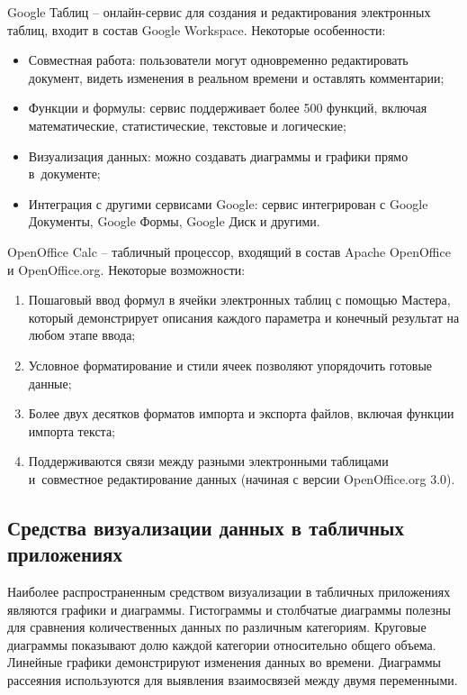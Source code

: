 \documentclass{ou}
\begin{document}
Google Таблиц -- онлайн-сервис для создания и редактирования электронных таблиц, входит в состав Google Workspace. Некоторые особенности:  
\begin{itemize}[label=-, leftmargin=0em, itemindent=3.35em, nosep]
\item Совместная работа: пользователи могут одновременно редактировать документ, видеть изменения в реальном времени и оставлять комментарии;
\item Функции и формулы: сервис поддерживает более 500 функций, включая математические, статистические, текстовые и логические;
\item Визуализация данных: можно создавать диаграммы и графики прямо в~документе;
\item Интеграция с другими сервисами Google: сервис интегрирован с Google Документы, Google Формы, Google Диск и другими.
\end{itemize}

OpenOffice Calc -- табличный процессор, входящий в состав Apache OpenOffice и OpenOffice.org. Некоторые возможности: 
\begin{enumerate}[leftmargin=0em, itemindent=3.75em, nosep, label=\arabic*)]
\item Пошаговый ввод формул в ячейки электронных таблиц с помощью Мастера, который демонстрирует описания каждого параметра и конечный результат на любом этапе ввода;
\item Условное форматирование и стили ячеек позволяют упорядочить готовые данные;
\item Более двух десятков форматов импорта и экспорта файлов, включая функции импорта текста;
\item Поддерживаются связи между разными электронными таблицами и~совместное редактирование данных (начиная с версии OpenOffice.org 3.0).
\end{enumerate}
\subsection{Средства визуализации данных в табличных приложениях}
Наиболее распространенным средством визуализации в табличных приложениях являются графики и диаграммы. Гистограммы и столбчатые диаграммы полезны для сравнения количественных данных по различным категориям. Круговые диаграммы показывают долю каждой категории относительно общего объема. Линейные графики демонстрируют изменения данных во времени. Диаграммы рассеяния используются для выявления взаимосвязей между двумя переменными.
\end{document}
